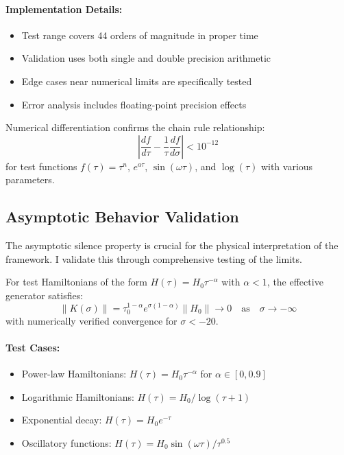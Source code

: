 \paragraph{Implementation Details:}
\begin{itemize}
\item Test range covers 44 orders of magnitude in proper time
\item Validation uses both single and double precision arithmetic
\item Edge cases near numerical limits are specifically tested
\item Error analysis includes floating-point precision effects
\end{itemize}

\begin{theorem}
\label{thm:chain_rule_validation}
Numerical differentiation confirms the chain rule relationship:
\begin{equation}
\left| \frac{df}{d\tau} - \frac{1}{\tau} \frac{df}{d\sigma} \right| < 10^{-12}
\end{equation}
for test functions $f(\tau) = \tau^n$, $e^{a\tau}$, $\sin(\omega\tau)$, and $\log(\tau)$ with various parameters.
\end{theorem}

\subsection{Asymptotic Behavior Validation}
\label{subsec:asymptotic_validation}

The asymptotic silence property is crucial for the physical interpretation of the framework. I validate this through comprehensive testing of the limits.

\begin{theorem}
\label{thm:asymptotic_silence_verification}
For test Hamiltonians of the form $H(\tau) = H_0 \tau^{-\alpha}$ with $\alpha < 1$, the effective generator satisfies:
\begin{equation}
\|K(\sigma)\| = \tau_0^{1-\alpha} e^{\sigma(1-\alpha)} \|H_0\| \to 0 \quad \text{as} \quad \sigma \to -\infty
\end{equation}
with numerically verified convergence for $\sigma < -20$.
\end{theorem}

\paragraph{Test Cases:}
\begin{itemize}
\item Power-law Hamiltonians: $H(\tau) = H_0 \tau^{-\alpha}$ for $\alpha \in [0, 0.9]$
\item Logarithmic Hamiltonians: $H(\tau) = H_0 / \log(\tau + 1)$
\item Exponential decay: $H(\tau) = H_0 e^{-\tau}$
\item Oscillatory functions: $H(\tau) = H_0 \sin(\omega\tau) / \tau^{0.5}$
\end{itemize}

